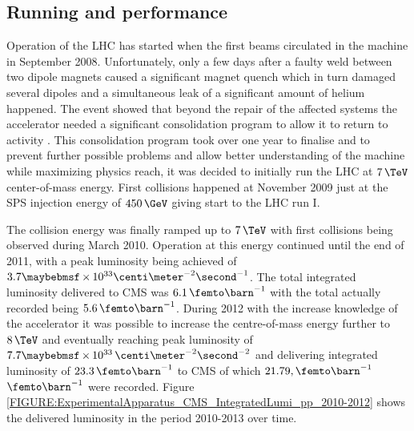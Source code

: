 \subsection{Running and performance}
\label{SUBSECTION:ExperimentalApparatus_CMS_RunningAndPerformance}

Operation of the \gls{LHC} has started when the first beams circulated in the machine in September 2008. Unfortunately, only a few days after a faulty weld between two dipole magnets caused a significant magnet quench which in turn damaged several dipoles and a simultaneous leak of a significant amount of helium happened. The event showed that beyond the repair of the affected systems the accelerator needed a significant consolidation program to allow it to return to activity \cite{ARTICLE:CMSReportIncident19Sep2008}. This consolidation program took over one year to finalise and to prevent further possible problems and allow better understanding of the machine while maximizing physics reach, it was decided to initially run the \gls{LHC} at $7\,\TeV$ center-of-mass energy.
First collisions happened at November 2009 just at the \gls{SPS} injection energy of $450\,\GeV$ giving start to the \gls{LHC} run I.

The collision energy was finally ramped up to $7\,\TeV$ with first collisions being observed during March 2010. Operation at this energy continued until the end of 2011, with a peak luminosity being achieved of $3.7 \times 10^{33} \centi\meter^{-2}\second^{-1}$. The total integrated luminosity delivered to \gls{CMS} was $6.1\,\femto\barn^{-1}$ with the total actually recorded being $5.6\,\femto\barn^{-1}$. During 2012 with the increase knowledge of the accelerator it was possible to increase the centre-of-mass energy further to $8\,\TeV$ and eventually reaching peak luminosity of $7.7 \times 10^{33}\,\centi\meter^{-2}\second^{-2}$ and delivering integrated luminosity of $23.3\,\femto\barn^{-1}$ to \gls{CMS} of which $21.79,\femto\barn^{-1}$  $\femto\barn^{-1}$ were recorded. Figure \ref{FIGURE:ExperimentalApparatus_CMS_IntegratedLumi_pp_2010-2012} shows the delivered luminosity in the period 2010-2013 over time.


